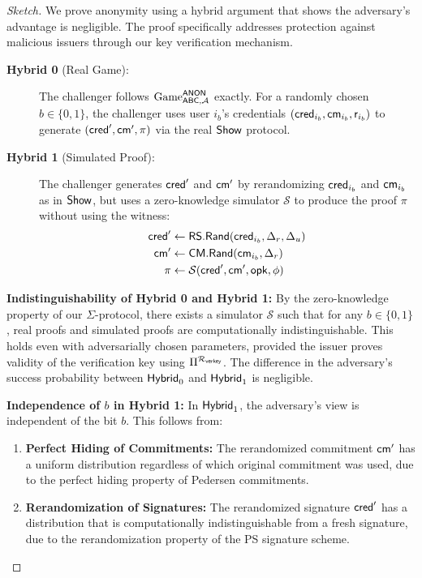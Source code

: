 \begin{proof}[Sketch]
We prove anonymity using a hybrid argument that shows the adversary's advantage is negligible. The proof specifically addresses protection against malicious issuers through our key verification mechanism.

\begin{description}
    \item[\textbf{Hybrid 0} (Real Game):] The challenger follows $\mathrm{Game}_{\mathsf{ABC},\mathcal{A}}^{\mathsf{ANON}}$ exactly. For a randomly chosen $b \in \{0,1\}$, the challenger uses user $i_b$'s credentials $(\mathsf{cred}_{i_b}, \mathsf{cm}_{i_b}, \mathsf{r}_{i_b})$ to generate $(\mathsf{cred}', \mathsf{cm}', \pi)$ via the real $\mathsf{Show}$ protocol. 
    
    \item[\textbf{Hybrid 1} (Simulated Proof):] The challenger generates $\mathsf{cred}'$ and $\mathsf{cm}'$ by rerandomizing $\mathsf{cred}_{i_b}$ and $\mathsf{cm}_{i_b}$ as in $\mathsf{Show}$, but uses a zero-knowledge simulator $\mathcal{S}$ to produce the proof $\pi$ without using the witness:
    \begin{align*}
        \mathsf{cred}' &\gets \mathsf{RS.Rand}(\mathsf{cred}_{i_b}, \Delta_r, \Delta_u)\\
        \mathsf{cm}' &\gets \mathsf{CM.Rand}(\mathsf{cm}_{i_b}, \Delta_r)\\
        \pi &\gets \mathcal{S}(\mathsf{cred}', \mathsf{cm}', \mathsf{opk}, \phi)
    \end{align*}
\end{description}

\noindent\textbf{Indistinguishability of Hybrid 0 and Hybrid 1:} By the zero-knowledge property of our $\Sigma$-protocol, there exists a simulator $\mathcal{S}$ such that for any $b \in \{0,1\}$, real proofs and simulated proofs are computationally indistinguishable. This holds even with adversarially chosen parameters, provided the issuer proves validity of the verification key using $\Pi^{\mathcal{R}_{\mathsf{verkey}}}$. The difference in the adversary's success probability between $\mathsf{Hybrid}_0$ and $\mathsf{Hybrid}_1$ is negligible.

\noindent\textbf{Independence of $b$ in Hybrid 1:} In $\mathsf{Hybrid}_1$, the adversary's view is independent of the bit $b$. This follows from:
\begin{enumerate}
    \item \textbf{Perfect Hiding of Commitments:} The rerandomized commitment $\mathsf{cm}'$ has a uniform distribution regardless of which original commitment was used, due to the perfect hiding property of Pedersen commitments.
    
    \item \textbf{Rerandomization of Signatures:} The rerandomized signature $\mathsf{cred}'$ has a distribution that is computationally indistinguishable from a fresh signature, due to the rerandomization property of the PS signature scheme.
    

\end{enumerate}
\end{proof}
